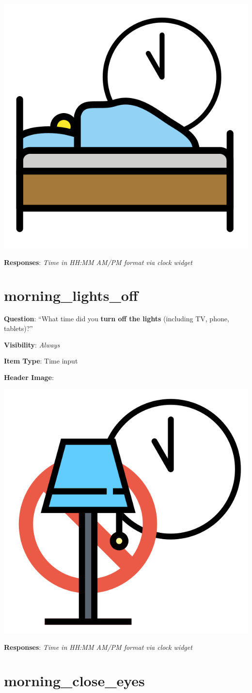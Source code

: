 \documentclass[]{book}
\begin{document}
\begin{flushleft}\includegraphics[width=0.33\linewidth]{downloadFigs4latex_NIMH_Applet_Codebook/morning_bedtime_headerImg} \end{flushleft}

\textbf{Responses}: \emph{Time in HH:MM AM/PM format via clock widget}

\hypertarget{morning_lights_off}{%
\section{morning\_lights\_off}\label{morning_lights_off}}

\textbf{Question}: ``What time did you \textbf{turn off the lights} (including TV, phone, tablets)?''

\textbf{Visibility}: \emph{Always}

\textbf{Item Type}: Time input

\textbf{Header Image}:

\begin{flushleft}\includegraphics[width=0.33\linewidth]{downloadFigs4latex_NIMH_Applet_Codebook/morning_lights_off_headerImg} \end{flushleft}

\textbf{Responses}: \emph{Time in HH:MM AM/PM format via clock widget}

\hypertarget{morning_close_eyes}{%
\section{morning\_close\_eyes}\label{morning_close_eyes}}
\end{document}
